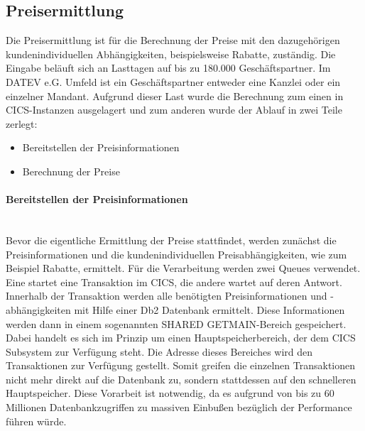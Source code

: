 \subsection{Preisermittlung}\label{ssec:preis}
Die Preisermittlung ist für die Berechnung der Preise mit den dazugehörigen kundenindividuellen Abhängigkeiten, beispielsweise Rabatte, zuständig.
Die Eingabe beläuft sich an Lasttagen auf bis zu 180.000 Geschäftspartner.
Im DATEV e.G. Umfeld ist ein Geschäftspartner entweder eine Kanzlei oder ein einzelner Mandant.
Aufgrund dieser Last wurde die Berechnung zum einen in CICS-Instanzen ausgelagert und zum anderen wurde der Ablauf in zwei Teile zerlegt:
\begin{itemize}
\item Bereitstellen der Preisinformationen
\item Berechnung der Preise
\end{itemize}
\paragraph{Bereitstellen der Preisinformationen}~\\
Bevor die eigentliche Ermittlung der Preise stattfindet, werden zunächst die Preisinformationen und die kundenindividuellen Preisabhängigkeiten, wie zum Beispiel Rabatte, ermittelt.
Für die Verarbeitung werden zwei Queues verwendet.
Eine startet eine Transaktion im CICS, die andere wartet auf deren Antwort.
Innerhalb der Transaktion werden alle benötigten Preisinformationen und -abhängigkeiten mit Hilfe einer Db2 Datenbank ermittelt.
Diese Informationen werden dann in einem sogenannten \glqq SHARED GETMAIN\grqq-Bereich gespeichert.
Dabei handelt es sich im Prinzip um einen Hauptspeicherbereich, der dem CICS Subsystem zur Verfügung steht.
Die Adresse dieses Bereiches wird den Transaktionen zur Verfügung gestellt.
Somit greifen die einzelnen Transaktionen nicht mehr direkt auf die Datenbank zu, sondern stattdessen auf den schnelleren Hauptspeicher.
Diese Vorarbeit ist notwendig, da es aufgrund von bis zu 60 Millionen Datenbankzugriffen zu massiven Einbußen bezüglich der Performance führen würde.

